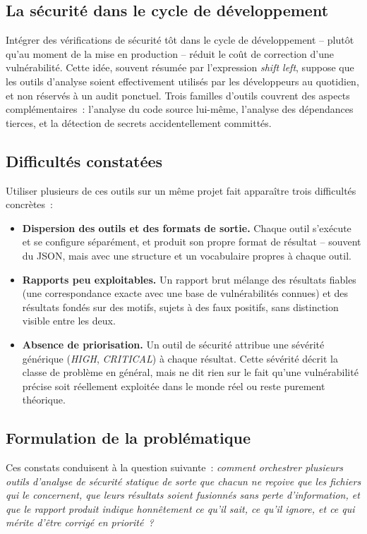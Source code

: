 \documentclass[12pt,a4paper,oneside]{report}
\begin{document}
\subsection{La s\'ecurit\'e dans le cycle de d\'eveloppement}
Int\'egrer des v\'erifications de s\'ecurit\'e t\^ot dans le cycle de d\'eveloppement -- plut\^ot qu'au moment de la mise en production -- r\'eduit le co\^ut de correction d'une vuln\'erabilit\'e. Cette id\'ee, souvent r\'esum\'ee par l'expression \emph{shift left}, suppose que les outils d'analyse soient effectivement utilis\'es par les d\'eveloppeurs au quotidien, et non r\'eserv\'es \`a un audit ponctuel. Trois familles d'outils couvrent des aspects compl\'ementaires~: l'analyse du code source lui-m\^eme, l'analyse des d\'ependances tierces, et la d\'etection de secrets accidentellement committ\'es.

\subsection{Difficult\'es constat\'ees}
Utiliser plusieurs de ces outils sur un m\^eme projet fait appara\^itre trois difficult\'es concr\`etes~:
\begin{itemize}
\item \textbf{Dispersion des outils et des formats de sortie.} Chaque outil s'ex\'ecute et se configure s\'epar\'ement, et produit son propre format de r\'esultat -- souvent du JSON, mais avec une structure et un vocabulaire propres \`a chaque outil.
\item \textbf{Rapports peu exploitables.} Un rapport brut m\'elange des r\'esultats fiables (une correspondance exacte avec une base de vuln\'erabilit\'es connues) et des r\'esultats fond\'es sur des motifs, sujets \`a des faux positifs, sans distinction visible entre les deux.
\item \textbf{Absence de priorisation.} Un outil de s\'ecurit\'e attribue une s\'ev\'erit\'e g\'en\'erique (\emph{HIGH}, \emph{CRITICAL}) \`a chaque r\'esultat. Cette s\'ev\'erit\'e d\'ecrit la classe de probl\`eme en g\'en\'eral, mais ne dit rien sur le fait qu'une vuln\'erabilit\'e pr\'ecise soit r\'eellement exploit\'ee dans le monde r\'eel ou reste purement th\'eorique.
\end{itemize}

\subsection{Formulation de la probl\'ematique}
Ces constats conduisent \`a la question suivante~: \emph{comment orchestrer plusieurs outils d'analyse de s\'ecurit\'e statique de sorte que chacun ne re\c{c}oive que les fichiers qui le concernent, que leurs r\'esultats soient fusionn\'es sans perte d'information, et que le rapport produit indique honn\^etement ce qu'il sait, ce qu'il ignore, et ce qui m\'erite d'\^etre corrig\'e en priorit\'e~?}
\end{document}
